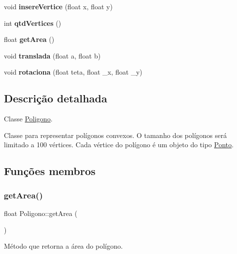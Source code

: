 \begin{DoxyCompactItemize}
\mbox{\label{classPoligono_aeaad76667207d96ea0d69c2dfb3bc2a9}} 
void {\bfseries insere\+Vertice} (float x, float y)
\item 
\mbox{\label{classPoligono_ae2c1c915b4a72104724d1302138e7caa}} 
int {\bfseries qtd\+Vertices} ()
\item 
\mbox{\label{classPoligono_ab1a85a090e7442bf3151602b05da9e19}} 
float {\bfseries get\+Area} ()
\item 
\mbox{\label{classPoligono_adbf605dfd0419b7301c9be0ec1dbe41b}} 
void {\bfseries translada} (float a, float b)
\item 
\mbox{\label{classPoligono_a93da79ac2b0cfd723c4c041f2fe1190c}} 
void {\bfseries rotaciona} (float teta, float \+\_\+x, float \+\_\+y)
\end{DoxyCompactItemize}


\subsection{Descrição detalhada}
Classe \mbox{\hyperlink{classPoligono}{Poligono}}. 

Classe para representar polígonos convexos. O tamanho dos polígonos será limitado a 100 vértices. Cada vértice do polígono é um objeto do tipo \mbox{\hyperlink{classPonto}{Ponto}}. 

\subsection{Funções membros}
\mbox{\label{classPoligono_ab1a85a090e7442bf3151602b05da9e19}} 
\subsubsection{\texorpdfstring{get\+Area()}{getArea()}}
{\footnotesize\ttfamily float Poligono\+::get\+Area (\begin{DoxyParamCaption}{ }\end{DoxyParamCaption})}



Método que retorna a área do polígono. 

